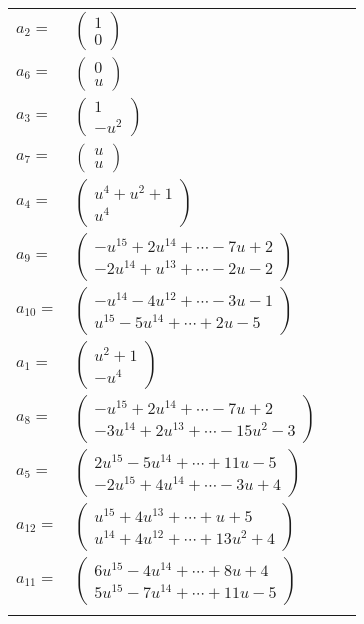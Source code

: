 \documentclass[1p]{elsarticle_modified}
\theoremstyle{definition}
\begin{document}
\begin{tabular}{m{7pt} m{180pt} m{7pt} m{180pt} }
\flushright $a_{2}=$&$\begin{pmatrix}1\\0\end{pmatrix}$ \\
\flushright $a_{6}=$&$\begin{pmatrix}0\\u\end{pmatrix}$ \\
\flushright $a_{3}=$&$\begin{pmatrix}1\\- u^2\end{pmatrix}$ \\
\flushright $a_{7}=$&$\begin{pmatrix}u\\u\end{pmatrix}$ \\
\flushright $a_{4}=$&$\begin{pmatrix}u^4+u^2+1\\u^4\end{pmatrix}$ \\
\flushright $a_{9}=$&$\begin{pmatrix}- u^{15}+2 u^{14}+\cdots-7 u+2\\-2 u^{14}+u^{13}+\cdots-2 u-2\end{pmatrix}$ \\
\flushright $a_{10}=$&$\begin{pmatrix}- u^{14}-4 u^{12}+\cdots-3 u-1\\u^{15}-5 u^{14}+\cdots+2 u-5\end{pmatrix}$ \\
\flushright $a_{1}=$&$\begin{pmatrix}u^2+1\\- u^4\end{pmatrix}$ \\
\flushright $a_{8}=$&$\begin{pmatrix}- u^{15}+2 u^{14}+\cdots-7 u+2\\-3 u^{14}+2 u^{13}+\cdots-15 u^2-3\end{pmatrix}$ \\
\flushright $a_{5}=$&$\begin{pmatrix}2 u^{15}-5 u^{14}+\cdots+11 u-5\\-2 u^{15}+4 u^{14}+\cdots-3 u+4\end{pmatrix}$ \\
\flushright $a_{12}=$&$\begin{pmatrix}u^{15}+4 u^{13}+\cdots+u+5\\u^{14}+4 u^{12}+\cdots+13 u^2+4\end{pmatrix}$ \\
\flushright $a_{11}=$&$\begin{pmatrix}6 u^{15}-4 u^{14}+\cdots+8 u+4\\5 u^{15}-7 u^{14}+\cdots+11 u-5\end{pmatrix}$\\&\end{tabular}
\end{document}
